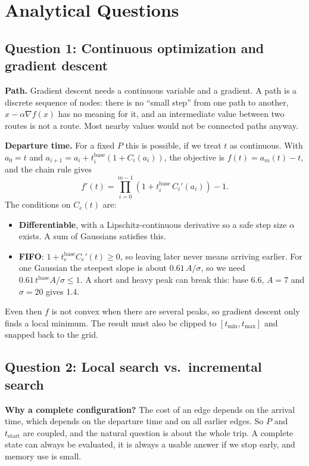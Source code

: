 \documentclass[11pt,a4paper]{article}
\begin{document}
\section{Analytical Questions}

\subsection*{Question 1: Continuous optimization and gradient descent}

\textbf{Path.} Gradient descent needs a continuous variable and a gradient. A path is a discrete
sequence of nodes: there is no ``small step'' from one path to another, $x - \alpha\nabla f(x)$
has no meaning for it, and an intermediate value between two routes is not a route. Most nearby
values would not be connected paths anyway.

\textbf{Departure time.} For a fixed $P$ this is possible, if we treat $t$ as continuous. With
$a_0 = t$ and $a_{i+1} = a_i + t^{\text{base}}_i (1 + C_i(a_i))$, the objective is
$f(t) = a_m(t) - t$, and the chain rule gives
\[
f'(t) = \prod_{i=0}^{m-1} \left( 1 + t^{\text{base}}_i \, C_i'(a_i) \right) - 1 .
\]
The conditions on $C_e(t)$ are:
\begin{itemize}
  \item \textbf{Differentiable}, with a Lipschitz-continuous derivative so a safe step size
  $\alpha$ exists. A sum of Gaussians satisfies this.
  \item \textbf{FIFO}: $1 + t^{\text{base}}_e C_e'(t) \ge 0$, so leaving later never means arriving
  earlier. For one Gaussian the steepest slope is about $0.61\,A/\sigma$, so we need
  $0.61\, t^{\text{base}} A / \sigma \le 1$. A short and heavy peak can break this: base 6.6,
  $A = 7$ and $\sigma = 20$ gives 1.4.
\end{itemize}
Even then $f$ is not convex when there are several peaks, so gradient descent only finds a local
minimum. The result must also be clipped to $[t_{\min}, t_{\max}]$ and snapped back to the grid.

\subsection*{Question 2: Local search vs.\ incremental search}

\textbf{Why a complete configuration?} The cost of an edge depends on the arrival time, which depends
on the departure time and on all earlier edges. So $P$ and $t_{\text{start}}$ are coupled, and the
natural question is about the whole trip. A complete state can always be evaluated, it is always a
usable answer if we stop early, and memory use is small.
\end{document}
